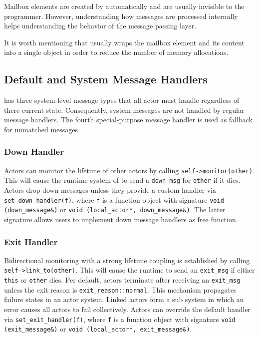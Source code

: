 Mailbox elements are created by \lib automatically and are usually invisible to the programmer. However, understanding how messages are processed internally helps understanding the behavior of the message passing layer.

It is worth mentioning that \lib usually wraps the mailbox element and its content into a single object in order to reduce the number of memory allocations.

\subsection{Default and System Message Handlers}

\lib has three system-level message types that all actor must handle regardless of there current state. Consequently, system messages are not handled by regular message handlers. The fourth special-purpose message handler is used as fallback for unmatched messages.

\subsubsection{Down  Handler}
\label{down-message}

Actors can monitor the lifetime of other actors by calling \lstinline^self->monitor(other)^. This will cause the runtime system of \lib to send a \lstinline^down_msg^ for \lstinline^other^ if it dies. Actors drop down messages unless they provide a custom handler via \lstinline^set_down_handler(f)^, where \lstinline^f^ is a function object with signature \lstinline^void (down_message&)^ or \lstinline^void (local_actor*, down_message&)^. The latter signature allows users to implement down message handlers as free function.

\subsubsection{Exit Handler}
\label{exit-message}

Bidirectional monitoring with a strong lifetime coupling is established by calling \lstinline^self->link_to(other)^. This will cause the runtime to send an \lstinline^exit_msg^ if either \lstinline^this^ or \lstinline^other^ dies. Per default, actors terminate after receiving an \lstinline^exit_msg^ unless the exit reason is \lstinline^exit_reason::normal^. This mechanism propagates failure states in an actor system. Linked actors form a sub system in which an error causes all actors to fail collectively. Actors can override the default handler via \lstinline^set_exit_handler(f)^, where \lstinline^f^ is a function object with signature \lstinline^void (exit_message&)^ or \lstinline^void (local_actor*, exit_message&)^.

